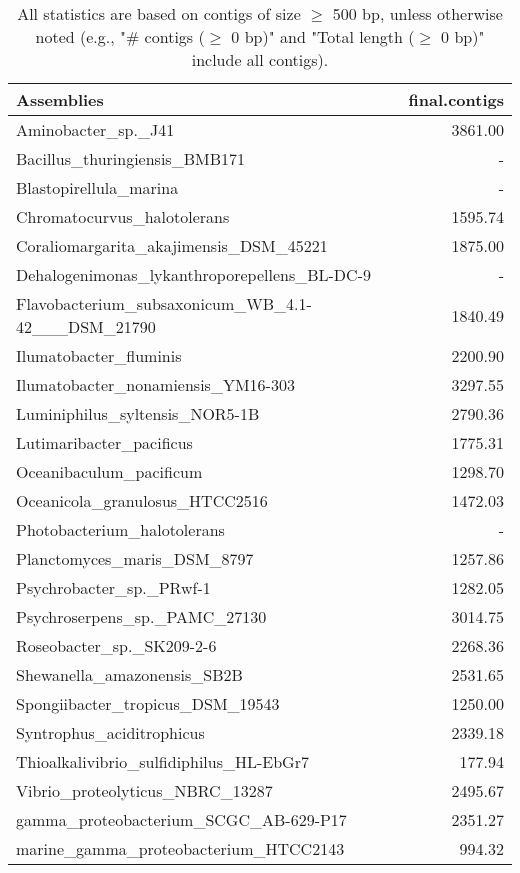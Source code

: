 \documentclass[12pt,a4paper]{article}
\begin{document}
\begin{table}[ht]
\begin{center}
\caption{All statistics are based on contigs of size $\geq$ 500 bp, unless otherwise noted (e.g., "\# contigs ($\geq$ 0 bp)" and "Total length ($\geq$ 0 bp)" include all contigs).}
\begin{tabular}{|l*{1}{|r}|}
\hline
Assemblies & final.contigs \\ \hline
Aminobacter\_sp.\_J41 & 3861.00 \\ \hline
Bacillus\_thuringiensis\_BMB171 & - \\ \hline
Blastopirellula\_marina & - \\ \hline
Chromatocurvus\_halotolerans & 1595.74 \\ \hline
Coraliomargarita\_akajimensis\_DSM\_45221 & 1875.00 \\ \hline
Dehalogenimonas\_lykanthroporepellens\_BL-DC-9 & - \\ \hline
Flavobacterium\_subsaxonicum\_WB\_4.1-42\_\_\_DSM\_21790 & 1840.49 \\ \hline
Ilumatobacter\_fluminis & 2200.90 \\ \hline
Ilumatobacter\_nonamiensis\_YM16-303 & 3297.55 \\ \hline
Luminiphilus\_syltensis\_NOR5-1B & 2790.36 \\ \hline
Lutimaribacter\_pacificus & 1775.31 \\ \hline
Oceanibaculum\_pacificum & 1298.70 \\ \hline
Oceanicola\_granulosus\_HTCC2516 & 1472.03 \\ \hline
Photobacterium\_halotolerans & - \\ \hline
Planctomyces\_maris\_DSM\_8797 & 1257.86 \\ \hline
Psychrobacter\_sp.\_PRwf-1 & 1282.05 \\ \hline
Psychroserpens\_sp.\_PAMC\_27130 & 3014.75 \\ \hline
Roseobacter\_sp.\_SK209-2-6 & 2268.36 \\ \hline
Shewanella\_amazonensis\_SB2B & 2531.65 \\ \hline
Spongiibacter\_tropicus\_DSM\_19543 & 1250.00 \\ \hline
Syntrophus\_aciditrophicus & 2339.18 \\ \hline
Thioalkalivibrio\_sulfidiphilus\_HL-EbGr7 & 177.94 \\ \hline
Vibrio\_proteolyticus\_NBRC\_13287 & 2495.67 \\ \hline
gamma\_proteobacterium\_SCGC\_AB-629-P17 & 2351.27 \\ \hline
marine\_gamma\_proteobacterium\_HTCC2143 & 994.32 \\ \hline
\end{tabular}
\end{center}
\end{table}
\end{document}
